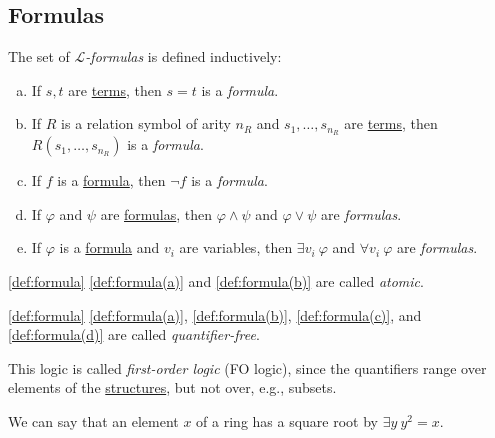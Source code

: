 \subsection{Formulas}
\begin{definition}[Formula]\label{def:formula}
	The set of \emph{\(\mathcal{L} \)-formulas} is defined inductively:
	\begin{enumerate}[(a)]
		\item\label{def:formula(a)} If \(s, t\) are \hyperref[def:term]{terms}, then \(s=t\) is a \emph{formula}.
		\item\label{def:formula(b)} If \(R\) is a relation symbol of arity \(n_R\) and \(s_1, \ldots , s_{n_R}\) are \hyperref[def:term]{terms}, then \(R(s_1, \ldots , s_{n_R})\) is a \emph{formula}.
		\item\label{def:formula(c)} If \(f\) is a \hyperref[def:formula]{formula}, then \(\lnot f\) is a \emph{formula}.
		\item\label{def:formula(d)} If \(\varphi\) and \(\psi\) are \hyperref[def:formula]{formulas}, then \(\varphi \land \psi \) and \(\varphi \lor \psi \) are \emph{formulas}.
		\item\label{def:formula(e)} If \(\varphi \) is a \hyperref[def:formula]{formula} and \(v_i\) are variables, then \(\exists v_i \ \varphi \) and \(\forall v_i \ \varphi \) are \emph{formulas}.
	\end{enumerate}
\end{definition}

\begin{notation}[Atomic]\label{not:atomic}
	\autoref{def:formula} \autoref{def:formula(a)} and \autoref{def:formula(b)} are called \emph{atomic}.
\end{notation}

\begin{notation}\label{not:quantifier-free}
	\autoref{def:formula} \autoref{def:formula(a)}, \autoref{def:formula(b)}, \autoref{def:formula(c)}, and \autoref{def:formula(d)} are called \emph{quantifier-free}.
\end{notation}

This logic is called \emph{first-order logic} (FO logic), since the quantifiers range over elements of the \hyperref[def:structure]{structures}, but not over, e.g., subsets.

\begin{eg}
	We can say that an element \(x\) of a ring has a square root by \(\exists y\ y^2 = x\).
\end{eg}

